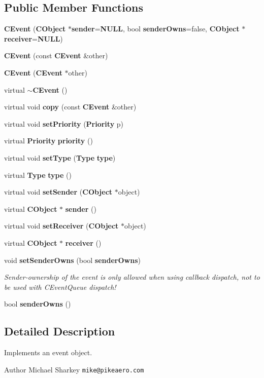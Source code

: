 \subsection*{Public Member Functions}
\begin{DoxyCompactItemize}
\item 
{\bf C\+Event} ({\bf C\+Object} $\ast${\bf sender}={\bf N\+U\+LL}, bool {\bf sender\+Owns}=false, {\bf C\+Object} $\ast${\bf receiver}={\bf N\+U\+LL})
\item 
{\bf C\+Event} (const {\bf C\+Event} \&other)
\item 
{\bf C\+Event} ({\bf C\+Event} $\ast$other)
\item 
virtual {\bf $\sim$\+C\+Event} ()
\item 
virtual void {\bf copy} (const {\bf C\+Event} \&other)
\item 
virtual void {\bf set\+Priority} ({\bf Priority} p)
\item 
virtual {\bf Priority} {\bf priority} ()
\item 
virtual void {\bf set\+Type} ({\bf Type} {\bf type})
\item 
virtual {\bf Type} {\bf type} ()
\item 
virtual void {\bf set\+Sender} ({\bf C\+Object} $\ast$object)
\item 
virtual {\bf C\+Object} $\ast$ {\bf sender} ()
\item 
virtual void {\bf set\+Receiver} ({\bf C\+Object} $\ast$object)
\item 
virtual {\bf C\+Object} $\ast$ {\bf receiver} ()
\item 
void {\bf set\+Sender\+Owns} (bool {\bf sender\+Owns})
\begin{DoxyCompactList}\small\item\em Sender-\/ownership of the event is only allowed when using callback dispatch, not to be used with C\+Event\+Queue dispatch! \end{DoxyCompactList}\item 
bool {\bf sender\+Owns} ()
\end{DoxyCompactItemize}


\subsection{Detailed Description}
Implements an event object. 

\begin{DoxyAuthor}{Author}
Michael Sharkey {\tt mike@pikeaero.\+com} 
\end{DoxyAuthor}


